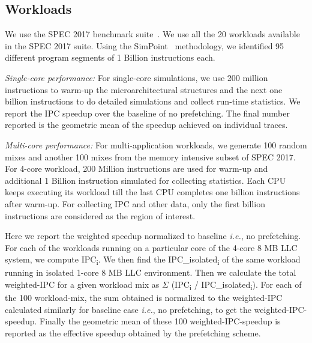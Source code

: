 \subsection{Workloads}
\label{Method-Workloads}

We use the SPEC 2017 benchmark suite~\cite{SPEC2017}.  We use all the 20
workloads available in the SPEC 2017 suite.  Using the SimPoint~\cite{SimPoint}
methodology, we identified 95 different program segments of 1 Billion
instructions each.

\textit{Single-core performance:} For single-core simulations, we use 200
million instructions to warm-up the microarchitectural structures and the next
one billion instructions to do detailed simulations and collect run-time
statistics. We report the IPC speedup over the baseline of no prefetching.
The final number reported is the geometric mean of the speedup achieved on
individual traces.

\textit{Multi-core performance:} For multi-application workloads, we generate
100 random mixes and another 100 mixes from the memory intensive subset of
SPEC 2017.  For 4-core workload, 200 Million instructions are used for warm-up
and additional 1 Billion instruction simulated for collecting statistics.
Each CPU keeps executing its workload till the last CPU completes one billion
instructions after warm-up.  For collecting IPC and other data, only the first
billion instructions are considered as the region of interest.

Here we report the weighted speedup normalized to baseline
\textit{i.e.}, no prefetching.  For each of the workloads running on a
particular core of the 4-core 8 MB LLC system, we compute
IPC\textsubscript{i}.  We then find the IPC\_isolated\textsubscript{i}
of the same workload running in isolated 1-core 8 MB LLC environment.
Then we calculate the total weighted-IPC for a given workload mix as
$\Sigma$ (IPC\textsubscript{i} / IPC\_isolated\textsubscript{i}).  For
each of the 100 workload-mix, the sum obtained is normalized to the
weighted-IPC calculated similarly for baseline case \textit{i.e.}, no
prefetching, to get the weighted-IPC-speedup.  Finally the geometric
mean of these 100 weighted-IPC-speedup is reported as the effective
speedup obtained by the prefetching scheme.


